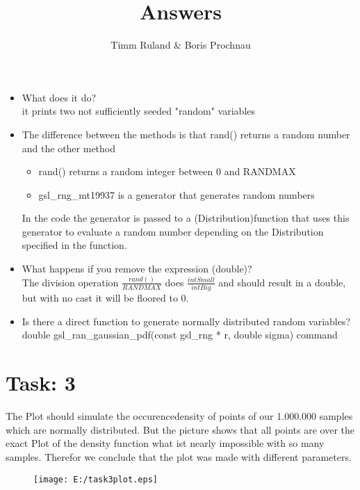 \documentclass{article}
\title{Answers}
\author{Timm Ruland \& Boris Prochnau}
\begin{document}
\maketitle

\begin{itemize}
\section{Task: 1}	%
	\item What does it do? \\
it prints two not sufficiently seeded "random" variables
	\item The difference between the methods is that rand() returns a random number 
and the other method
  
	\begin{itemize}
		\item rand() returns a random integer between 0 and RANDMAX
		\item gsl\_rng\_mt19937 is a generator that generates random numbers
	\end{itemize}
 In the code the generator is passed to a (Distribution)function that uses this generator 
 to evaluate a random number depending on the Distribution specified in the function.
	\item What happens if you remove the expression (double)?\\
 The division operation $\frac{rand()}{RANDMAX}$ does $\frac{int Small}{int Big}$ and
 should result in a double, but with no cast it will be floored to 0. 
	\item Is there a direct function to generate normally distributed random variables?\\
	double gsl\_ran\_gaussian\_pdf(const gsl\_rng * r, double sigma)
 command
\end{itemize}

\newpage
\section{Task: 3} %
The Plot should simulate the occurencedensity of points of our 1.000.000 samples which are normally distributed. But the picture
shows that all points are over the exact Plot of the density function what ist nearly impossible with so many samples. Therefor 
we conclude that the plot was made with different parameters.
\begin{figure}[h]
	\centering
		\texttt{[image: E:/task3plot.eps]}
	\label{fig:task3plot}
\end{figure}
\end{document}
